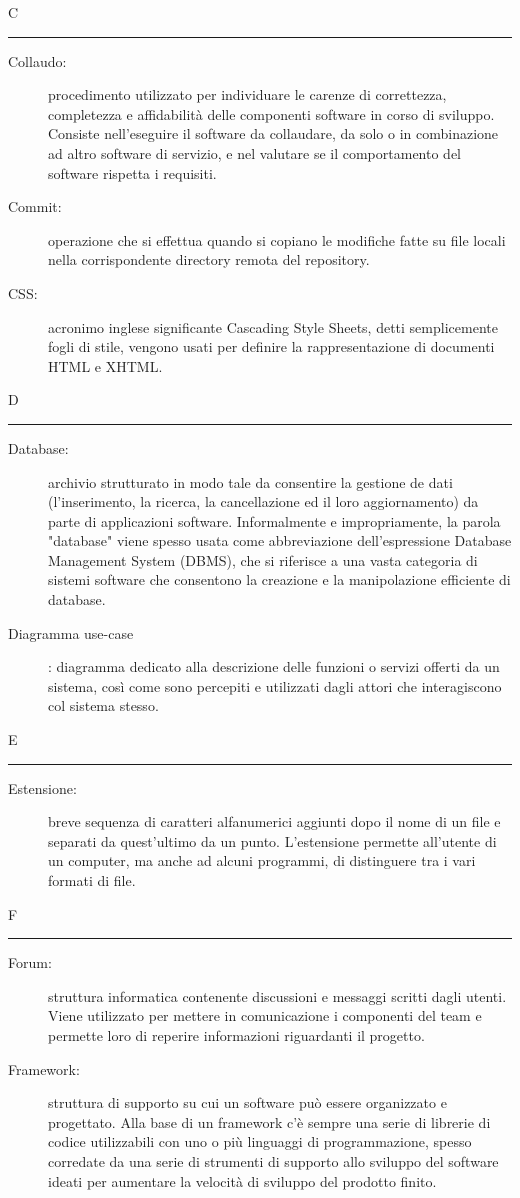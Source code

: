 \documentclass[11pt,a4paper]{article}
\begin{document}
\bigskip
\Huge C \bigskip
\hrule
\smallskip
\normalsize
\begin{description}
	\item[Collaudo:] procedimento utilizzato per individuare le carenze di correttezza, completezza e affidabilità delle componenti software in corso di sviluppo. Consiste nell'eseguire il software da collaudare, da solo o in combinazione ad altro software di servizio, e nel valutare se il comportamento del software rispetta i requisiti.
	\item[Commit:] operazione che si effettua quando si copiano le modifiche fatte su file locali nella corrispondente directory remota del repository.
	\item[CSS:] acronimo inglese significante Cascading Style Sheets, detti semplicemente fogli di stile, vengono usati per definire la rappresentazione di documenti HTML e XHTML.
\end{description}
\bigskip
\Huge D \bigskip
\hrule
\smallskip
\normalsize
\begin{description}
	\item[Database:] archivio strutturato in modo tale da consentire la gestione de dati (l'inserimento, la ricerca, la cancellazione ed il loro aggiornamento) da parte di applicazioni software. Informalmente e impropriamente, la parola "database" viene spesso usata come abbreviazione dell'espressione Database Management System (DBMS), che si riferisce a una vasta categoria di sistemi software che consentono la creazione e la manipolazione efficiente di database.
	\item[Diagramma use-case]: diagramma dedicato alla descrizione delle funzioni o servizi offerti da un sistema, così come sono percepiti e utilizzati dagli attori che interagiscono col sistema stesso.
\end{description}
\bigskip
\Huge E \bigskip
\hrule
\smallskip
\normalsize
\begin{description}
	\item[Estensione:] breve sequenza di caratteri alfanumerici aggiunti dopo il nome di un file e separati da quest'ultimo da un punto. L'estensione permette all'utente di un computer, ma anche ad alcuni programmi, di distinguere tra i vari formati di file.
\end{description}
\bigskip
\Huge F \bigskip
\hrule
\smallskip
\normalsize
\begin{description}
	\item[Forum:] struttura informatica contenente discussioni e messaggi scritti dagli utenti. Viene utilizzato per mettere in comunicazione i componenti del team e permette loro di reperire informazioni riguardanti il progetto.
	\item[Framework:] struttura di supporto su cui un software può essere organizzato e progettato. Alla base di un framework c'è sempre una serie di librerie di codice utilizzabili con uno o più linguaggi di programmazione, spesso corredate da una serie di strumenti di supporto allo sviluppo del software ideati per aumentare la velocità di sviluppo del prodotto finito.
\end{description}
\end{document}

